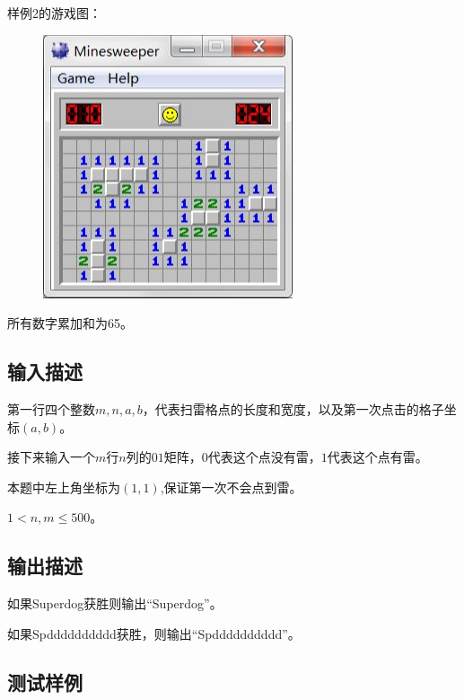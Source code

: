样例2的游戏图：
\begin{figure}[H]
    \centering
    \includegraphics[scale=0.5]{./src/d2.png}
\end{figure}
所有数字累加和为65。
\subsection*{输入描述}
第一行四个整数$m,n,a,b$，代表扫雷格点的长度和宽度，以及第一次点击的格子坐标$(a,b)$。

接下来输入一个$m$行$n$列的$01$矩阵，$0$代表这个点没有雷，$1$代表这个点有雷。

本题中左上角坐标为$(1,1)$,保证第一次不会点到雷。

$1 < n, m \le 500$。
\subsection*{输出描述}

如果Superdog获胜则输出``Superdog''。

如果Spdddddddddd获胜，则输出``Spdddddddddd''。

\subsection*{测试样例}

